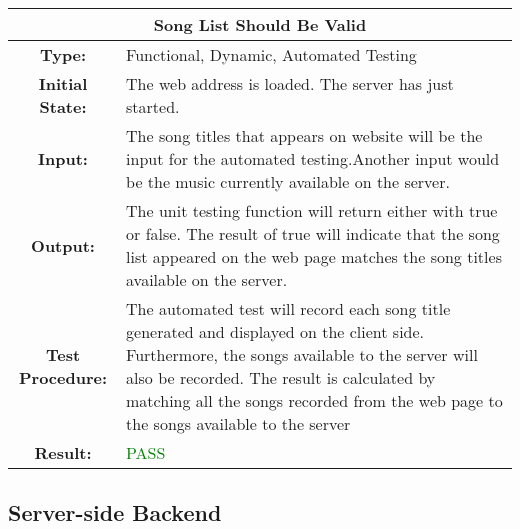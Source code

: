 \documentclass[12pt, titlepage]{article}
\begin{document}
\begin{center}
\begin{table}[H]
\begin{tabularx}{\textwidth}{| c X |}
\hline
\multicolumn{2}{|c|}{\textbf{Song List Should Be Valid}}\\
\hline
\textbf{Type: } & Functional, Dynamic, Automated Testing\\


\textbf{Initial State: } & The web address is loaded. The server has just started.\\


\textbf{Input: } & The song titles that appears on website will be the input for the automated testing.Another input would be the music currently available on the server.\\


\textbf{Output: } & The unit testing function will return either with true or false. The result of true will indicate that the song list appeared on the web page matches the song titles available on the server.\\


\textbf{Test Procedure:  } & The automated test will record each song title generated and displayed on the client side. Furthermore, the songs available to the server will also be recorded. The result is calculated by matching all the songs recorded from the web page to the songs available to the server\\


\textbf{Result: } & \textcolor{green}{PASS}\\
\hline
\end{tabularx}
\end{table}
\end{center}

\subsection{Server-side Backend}
\end{document}
